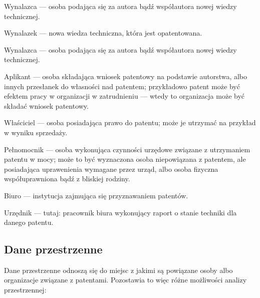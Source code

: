 \begin{defi}
Wynalazca --- osoba podająca się za autora bądź współautora nowej
wiedzy technicznej.
\end{defi}

\begin{defi}
Wynalazek --- nowa wiedza techniczna, która jest opatentowana.
\end{defi}

\begin{defi}
\label{defi:wynalazca}
Wynalazca --- osoba podająca się za autora bądź współautora nowej
wiedzy technicznej.
\end{defi}

\begin{defi}
\label{defi:aplikant}
Aplikant --- osoba składająca wniosek patentowy na podstawie autorstwa,
albo innych przesłanek do własności nad patentem; przykładowo patent
może być efektem pracy w organizacji w zatrudnieniu --- wtedy to
organizacja może być składać wniosek patentowy.
\end{defi}

\begin{defi}
Właściciel --- osoba posiadająca prawo do patentu; może je utrzymać
na przykład w wyniku sprzedaży.
\end{defi}

\begin{defi}
Pełnomocnik --- osoba wykonująca czynności urzędowe związane z
utrzymaniem patentu w mocy; może to być wyznaczona osoba niepowiązana z 
patentem, ale posiadająca uprawenienia wymagane przez urząd, albo
osoba fizyczna współuprawniona bądź z bliskiej rodziny.
\end{defi}

\begin{defi}
Biuro --- instytucja zajmująca się przyznawaniem patentów.
\end{defi}

\begin{defi}
Urzędnik --- tutaj: pracownik biura wykonujący raport o stanie
techniki dla danego patentu.
\end{defi}



\subsection{Dane przestrzenne}

Dane przestrzenne odnoszą się do miejsc z jakimi są powiązane
osoby albo organizacje związane z patentami. Pozostawia to więc 
różne możliwości analizy przestrzennej:

